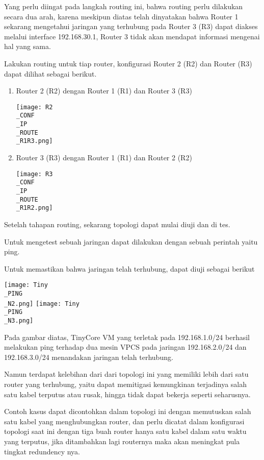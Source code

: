 \documentclass[12pt, a4paper]{article}
\begin{document}
  Yang perlu diingat pada langkah routing ini, bahwa routing perlu dilakukan
  secara dua arah, karena meskipun diatas telah dinyatakan bahwa Router 1 
  sekarang mengetahui jaringan yang terhubung pada Router 3 (R3) dapat diakses
  melalui interface 192.168.30.1, Router 3 tidak akan mendapat informasi mengenai
  hal yang sama.

  Lakukan routing untuk tiap router, konfigurasi Router 2 (R2) dan Router (R3)
  dapat dilihat sebagai berikut.

  \begin{enumerate}

    \item Router 2 (R2) dengan Router 1 (R1) dan Router 3 (R3)
          \begin{center}
            \texttt{[image: R2\\\_CONF\\\_IP\\\_ROUTE\\\_R1R3.png]}
          \end{center}

    \item Router 3 (R3) dengan Router 1 (R1) dan Router 2 (R2)
          \begin{center}
            \texttt{[image: R3\\\_CONF\\\_IP\\\_ROUTE\\\_R1R2.png]}
          \end{center}

  \end{enumerate}

  Setelah tahapan routing, sekarang topologi dapat mulai diuji dan di tes.

  Untuk mengetest sebuah jaringan dapat dilakukan dengan sebuah perintah
  yaitu ping.

  Untuk memastikan bahwa jaringan telah terhubung, dapat diuji sebagai berikut

  \begin{center}
    \texttt{[image: Tiny\\\_PING\\\_N2.png]}
    \texttt{[image: Tiny\\\_PING\\\_N3.png]}
  \end{center}

  Pada gambar diatas, TinyCore VM yang terletak pada 192.168.1.0/24 berhasil melakukan
  ping terhadap dua mesin VPCS pada jaringan 192.168.2.0/24 dan 192.168.3.0/24
  menandakan jaringan telah terhubung.

  Namun terdapat kelebihan dari dari topologi ini yang memiliki lebih
  dari satu router yang terhubung, yaitu dapat memitigasi kemungkinan
  terjadinya salah satu kabel terputus atau rusak, hingga tidak dapat
  bekerja seperti seharusnya.

  Contoh kasus dapat dicontohkan dalam topologi ini dengan memutuskan
  salah satu kabel yang menghubungkan router,
  dan perlu dicatat dalam konfigurasi topologi saat ini dengan tiga buah
  router hanya satu kabel dalam satu waktu yang terputus, jika ditambahkan
  lagi routernya maka akan meningkat pula tingkat redundency nya.
\end{document}
